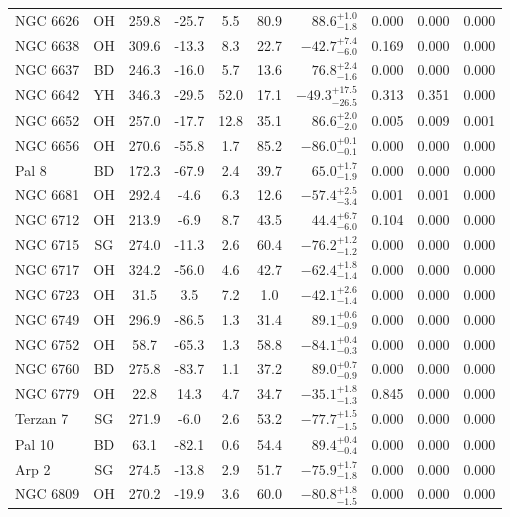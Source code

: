 \begin{tabular}{lcccccrccc}
	NGC 6626 & OH & 259.8 & -25.7 & 5.5 & 80.9 & $88.6^{+1.0}_{-1.8}$ & 0.000 & 0.000 & 0.000 \\
	NGC 6638 & OH & 309.6 & -13.3 & 8.3 & 22.7 & $-42.7^{+7.4}_{-6.0}$ & 0.169 & 0.000 & 0.000 \\
	NGC 6637 & BD & 246.3 & -16.0 & 5.7 & 13.6 & $76.8^{+2.4}_{-1.6}$ & 0.000 & 0.000 & 0.000 \\
	NGC 6642 & YH & 346.3 & -29.5 & 52.0 & 17.1 & $-49.3^{+17.5}_{-26.5}$ & 0.313 & 0.351 & 0.000 \\
	NGC 6652 & OH & 257.0 & -17.7 & 12.8 & 35.1 & $86.6^{+2.0}_{-2.0}$ & 0.005 & 0.009 & 0.001 \\
	NGC 6656 & OH & 270.6 & -55.8 & 1.7 & 85.2 & $-86.0^{+0.1}_{-0.1}$ & 0.000 & 0.000 & 0.000 \\
	Pal 8 & BD & 172.3 & -67.9 & 2.4 & 39.7 & $65.0^{+1.7}_{-1.9}$ & 0.000 & 0.000 & 0.000 \\
	NGC 6681 & OH & 292.4 & -4.6 & 6.3 & 12.6 & $-57.4^{+2.5}_{-3.4}$ & 0.001 & 0.001 & 0.000 \\
	NGC 6712 & OH & 213.9 & -6.9 & 8.7 & 43.5 & $44.4^{+6.7}_{-6.0}$ & 0.104 & 0.000 & 0.000 \\
	NGC 6715 & SG & 274.0 & -11.3 & 2.6 & 60.4 & $-76.2^{+1.2}_{-1.2}$ & 0.000 & 0.000 & 0.000 \\
	NGC 6717 & OH & 324.2 & -56.0 & 4.6 & 42.7 & $-62.4^{+1.8}_{-1.4}$ & 0.000 & 0.000 & 0.000 \\
	NGC 6723 & OH & 31.5 & 3.5 & 7.2 & 1.0 & $-42.1^{+2.6}_{-1.4}$ & 0.000 & 0.000 & 0.000 \\
	NGC 6749 & OH & 296.9 & -86.5 & 1.3 & 31.4 & $89.1^{+0.6}_{-0.9}$ & 0.000 & 0.000 & 0.000 \\
	NGC 6752 & OH & 58.7 & -65.3 & 1.3 & 58.8 & $-84.1^{+0.4}_{-0.3}$ & 0.000 & 0.000 & 0.000 \\
	NGC 6760 & BD & 275.8 & -83.7 & 1.1 & 37.2 & $89.0^{+0.7}_{-0.9}$ & 0.000 & 0.000 & 0.000 \\
	NGC 6779 & OH & 22.8 & 14.3 & 4.7 & 34.7 & $-35.1^{+1.8}_{-1.3}$ & 0.845 & 0.000 & 0.000 \\
	Terzan 7 & SG & 271.9 & -6.0 & 2.6 & 53.2 & $-77.7^{+1.5}_{-1.5}$ & 0.000 & 0.000 & 0.000 \\
	Pal 10 & BD & 63.1 & -82.1 & 0.6 & 54.4 & $89.4^{+0.4}_{-0.4}$ & 0.000 & 0.000 & 0.000 \\
	Arp 2 & SG & 274.5 & -13.8 & 2.9 & 51.7 & $-75.9^{+1.7}_{-1.8}$ & 0.000 & 0.000 & 0.000 \\
	NGC 6809 & OH & 270.2 & -19.9 & 3.6 & 60.0 & $-80.8^{+1.8}_{-1.5}$ & 0.000 & 0.000 & 0.000 \\

\end{tabular}

